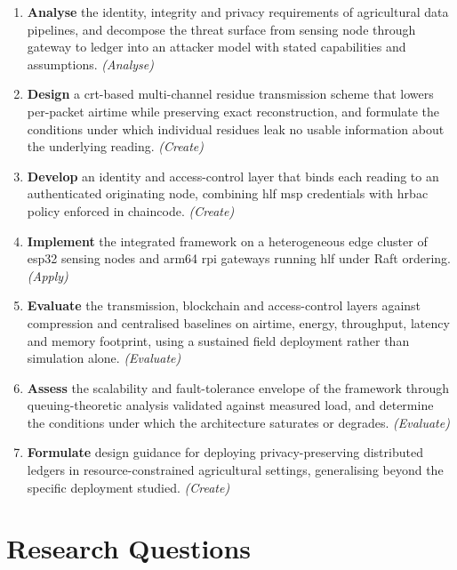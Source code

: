 \documentclass[12pt,a4paper,oneside]{book}
\begin{document}
\begin{enumerate}
  \item \textbf{Analyse} the identity, integrity and privacy requirements of
        agricultural data pipelines, and decompose the threat surface from
        sensing node through gateway to ledger into an attacker model with
        stated capabilities and assumptions. \emph{(Analyse)}

  \item \textbf{Design} a \gls{crt}-based multi-channel residue transmission
        scheme that lowers per-packet airtime while preserving exact
        reconstruction, and formulate the conditions under which individual
        residues leak no usable information about the underlying reading.
        \emph{(Create)}

  \item \textbf{Develop} an identity and access-control layer that binds each
        reading to an authenticated originating node, combining \gls{hlf}
        \gls{msp} credentials with \gls{hrbac} policy enforced in chaincode.
        \emph{(Create)}

  \item \textbf{Implement} the integrated framework on a heterogeneous edge
        cluster of \gls{esp32} sensing nodes and \gls{arm64} \gls{rpi} gateways
        running \gls{hlf} under Raft ordering. \emph{(Apply)}

  \item \textbf{Evaluate} the transmission, blockchain and access-control layers
        against compression and centralised baselines on airtime, energy,
        throughput, latency and memory footprint, using a sustained field
        deployment rather than simulation alone. \emph{(Evaluate)}

  \item \textbf{Assess} the scalability and fault-tolerance envelope of the
        framework through queuing-theoretic analysis validated against measured
        load, and determine the conditions under which the architecture
        saturates or degrades. \emph{(Evaluate)}

  \item \textbf{Formulate} design guidance for deploying privacy-preserving
        distributed ledgers in resource-constrained agricultural settings,
        generalising beyond the specific deployment studied. \emph{(Create)}
\end{enumerate}

\section{Research Questions}
\label{sec:research_questions}
\end{document}
